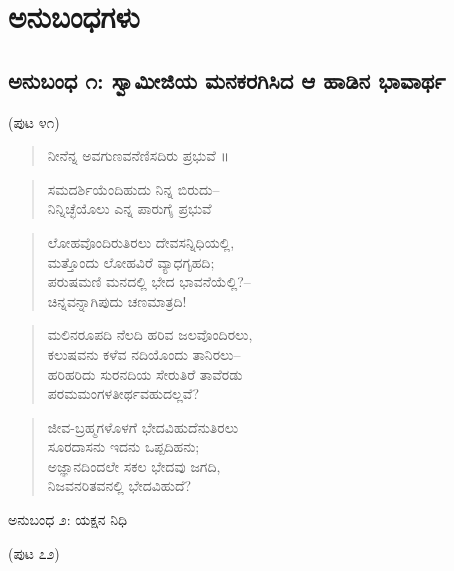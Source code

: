 
\chapter{ಅನುಬಂಧಗಳು}

\section{ಅನುಬಂಧ ೧: ಸ್ವಾಮೀಜಿಯ ಮನಕರಗಿಸಿದ ಆ ಹಾಡಿನ ಭಾವಾರ್ಥ}

\begin{center}
(ಪುಟ ೪೧)
\end{center}

\begin{verse}
ನೀನೆನ್ನ ಅವಗುಣವನೆಣಿಸದಿರು ಪ್ರಭುವೆ ॥
\end{verse}

\begin{verse}
ಸಮದರ್ಶಿಯೆಂದಿಹುದು ನಿನ್ನ ಬಿರುದು–\\ನಿನ್ನಿಚ್ಛೆಯೊಲು ಎನ್ನ ಪಾರುಗೈ ಪ್ರಭುವೆ
\end{verse}

\begin{verse}
ಲೋಹವೊಂದಿರುತಿರಲು ದೇವಸನ್ನಿಧಿಯಲ್ಲಿ,\\ಮತ್ತೊಂದು ಲೋಹವಿರೆ ವ್ಯಾಧಗೃಹದಿ;\\ಪರುಷಮಣಿ ಮನದಲ್ಲಿ ಭೇದ ಭಾವನೆಯೆಲ್ಲಿ?–\\ಚಿನ್ನವನ್ನಾಗಿಪುದು ಚಣಮಾತ್ರದಿ!
\end{verse}

\begin{verse}
ಮಲಿನರೂಪದಿ ನೆಲದಿ ಹರಿವ ಜಲವೊಂದಿರಲು,\\ಕಲುಷವನು ಕಳೆವ ನದಿಯೊಂದು ತಾನಿರಲು–\\ಹರಿಹರಿದು ಸುರನದಿಯ ಸೇರುತಿರೆ ತಾವೆರಡು\\ಪರಮಮಂಗಳತೀರ್ಥವಹುದಲ್ಲವೆ?
\end{verse}

\begin{verse}
ಜೀವ-ಬ್ರಹ್ಮಗಳೊಳಗೆ ಭೇದವಿಹುದೆನುತಿರಲು\\ಸೂರದಾಸನು ಇದನು ಒಪ್ಪದಿಹನು;\\ಅಜ್ಞಾನದಿಂದಲೇ ಸಕಲ ಭೇದವು ಜಗದಿ,\\ನಿಜವನರಿತವನಲ್ಲಿ ಭೇದವಿಹುದೆ?
\end{verse}



\begin{center}
ಅನುಬಂಧ ೨: ಯಕ್ಷನ ನಿಧಿ
\end{center}

\begin{center}
(ಪುಟ ೭೨)
\end{center}

